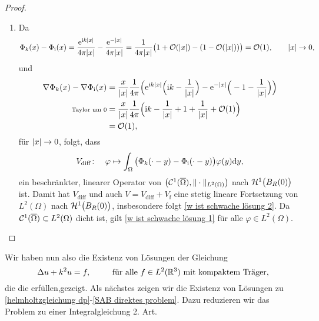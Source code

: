 \begin{proof}
\begin{enumerate}[label=(\roman*)]
		\item Da
		\begin{equation*}
			\Phi_k(x)-\Phi_{\mathrm{i}}(x)=\frac{\mathrm{e}^{\mathrm{i} k|x|}}{4\pi|x|}-\frac{\mathrm{e}^{-|x|}}{4\pi |x|}=\frac{1}{4\pi|x|}\big(1+\mathcal{O}(|x|)-(1-\mathcal{O}(|x|))\big)=\mathcal{O}(1),\qquad|x|\to0,
		\end{equation*}
		und
		\begin{align*}
			\nabla\Phi_k(x)-\nabla\Phi_{\mathrm{i}}(x)
			&=\frac{x}{|x|}\frac{1}{4\pi}\Big(\mathrm{e}^{\mathrm{i} k|x|}\Big(\mathrm{i} k-\frac{1}{|x|}\Big)-\mathrm{e}^{-|x|}\Big(-1-\frac{1}{|x|}\Big)\Big)\\
			\text{\scriptsize Taylor um \(0\)}&=\frac{x}{|x|}\frac{1}{4\pi}\Big(\mathrm{i} k-\frac{1}{|x|}+1+\frac{1}{|x|}+\mathcal{O}(1)\Big)\\
			&=\mathcal{O}(1),
		\end{align*}
		für \(|x|\rightarrow0\), folgt, dass
		\begin{equation*}
			V_{\mathrm{diff}}\colon\quad\varphi\mapsto\int_\Omega\big(\Phi_k(\cdot-y)-\Phi_{\mathrm{i}}(\cdot-y)\big)\varphi(y)\mathrm{d}y,
		\end{equation*}
		ein beschränkter, linearer Operator von \(\big(\mathcal{C}^1(\overline{\Omega}),\|\cdot\|_{L^2(\Omega)}\big)\) nach \(\mathcal{H}^1\big(B_R(0)\big)\) ist. Damit hat \(V_{\mathrm{diff}}\) und auch \(V=V_{\mathrm{diff}}+V_{\ii}\) eine stetig lineare Fortsetzung von \(L^2(\Omega)\) nach \(\mathcal{H}^1\big(B_R(0)\big)\), insbesondere folgt \eqref{w ist schwache lösung 2}. Da \(\mathcal{C}^1(\overline{\Omega})\subset L^2(\Omega)\) dicht ist, gilt \eqref{w ist schwache lösung 1} für alle \(\varphi\in L^2(\Omega)\).
	\end{enumerate}
\end{proof}
\noindent Wir haben nun also die Existenz von Lösungen der Gleichung
\begin{equation*}
	\Delta u+k^2u=f,\;\qquad\text{ für alle }f\in L^2(\mathbb{R}^3)\text{ mit kompaktem Träger},
\end{equation*}
die die \SABdp erfüllen,gezeigt. Als nächstes zeigen wir die Existenz von Lösungen zu \eqref{helmholtzgleichung dp}-\eqref{SAB direktes problem}. Dazu reduzieren wir das Problem zu einer Integralgleichung 2. Art.
